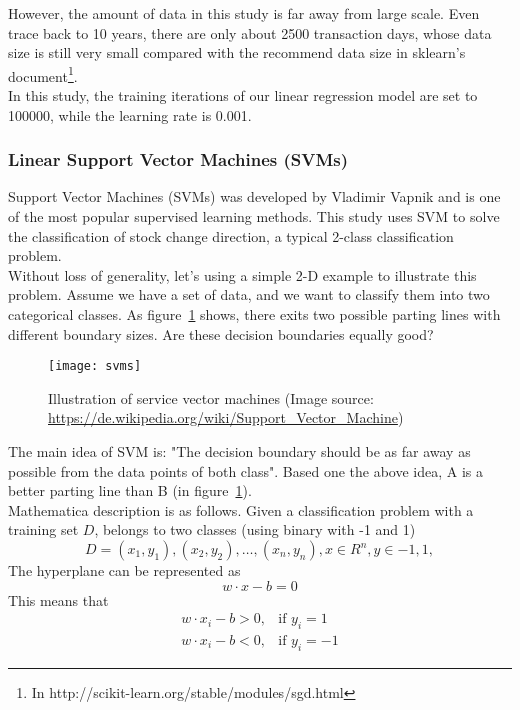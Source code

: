 However, the amount of data in this study is far away from large scale. Even trace back to 10 years, there are only about 2500 transaction days, whose data size is still very small compared with the recommend data size in sklearn's document\footnote{In http://scikit-learn.org/stable/modules/sgd.html}.\\

In this study, the training iterations of our linear regression model are set to 100000, while the learning rate is 0.001.

\subsubsection{Linear Support Vector Machines (SVMs)}
Support Vector Machines (SVMs) was developed by Vladimir Vapnik\cite[p.~105]{4_kantardzic} and is one of the most popular supervised learning methods. This study uses SVM to solve the classification of stock change direction, a typical 2-class classification problem.\\


Without loss of generality, let's using a simple 2-D example to illustrate this problem. Assume we have a set of data, and we want to classify them into two categorical classes. As figure~\ref{fg:SVM} shows, there exits two possible parting lines with different boundary sizes. Are these decision boundaries equally good?
\begin{figure}[h]
	\centering
	\texttt{[image: svms]}
	\caption{Illustration of service vector machines (Image source: \url{https://de.wikipedia.org/wiki/Support_Vector_Machine})}
	\label{fg:SVM}
\end{figure}
The main idea of SVM is: "The decision boundary should be as far away as possible from the data points of both class"\cite[p.~107]{4_kantardzic}. Based one the above idea, A is a better parting line than B (in figure~\ref{fg:SVM}).\\


Mathematica description is as follows\cite[Section~4.5]{4_kantardzic}. Given a classification problem with a training set $ D $, belongs to two classes (using binary with -1 and 1)
\begin{equation}
D={(x_1,y_1),(x_2,y_2),\dots,(x_n,y_n)},x\in R^n, y\in{-1, 1},
\end{equation}
The hyperplane can be represented as
\begin{equation}
w \cdot x-b=0
\end{equation}
This means that
\begin{align*}
w \cdot x_i-b>0,& \text{if $y_i = 1$}\\
w \cdot x_i-b<0,& \text{if $y_i = -1$}
\end{align*}


